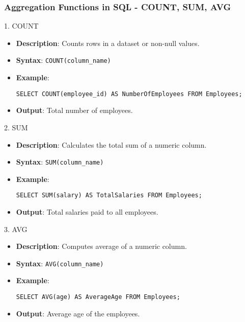 \documentclass[aspectratio=169]{beamer}
\begin{document}
\begin{frame}[fragile]
    \frametitle{Aggregation Functions in SQL - COUNT, SUM, AVG}
    \begin{block}{1. COUNT}
        \begin{itemize}
            \item \textbf{Description}: Counts rows in a dataset or non-null values.
            \item \textbf{Syntax}: \texttt{COUNT(column\_name)}
            \item \textbf{Example}:
            \begin{lstlisting}
SELECT COUNT(employee_id) AS NumberOfEmployees FROM Employees;
            \end{lstlisting}
            \item \textbf{Output}: Total number of employees.
        \end{itemize}
    \end{block}

    \begin{block}{2. SUM}
        \begin{itemize}
            \item \textbf{Description}: Calculates the total sum of a numeric column.
            \item \textbf{Syntax}: \texttt{SUM(column\_name)}
            \item \textbf{Example}:
            \begin{lstlisting}
SELECT SUM(salary) AS TotalSalaries FROM Employees;
            \end{lstlisting}
            \item \textbf{Output}: Total salaries paid to all employees.
        \end{itemize}
    \end{block}

    \begin{block}{3. AVG}
        \begin{itemize}
            \item \textbf{Description}: Computes average of a numeric column.
            \item \textbf{Syntax}: \texttt{AVG(column\_name)}
            \item \textbf{Example}:
            \begin{lstlisting}
SELECT AVG(age) AS AverageAge FROM Employees;
            \end{lstlisting}
            \item \textbf{Output}: Average age of the employees.
        \end{itemize}
    \end{block}
\end{frame}
\end{document}
